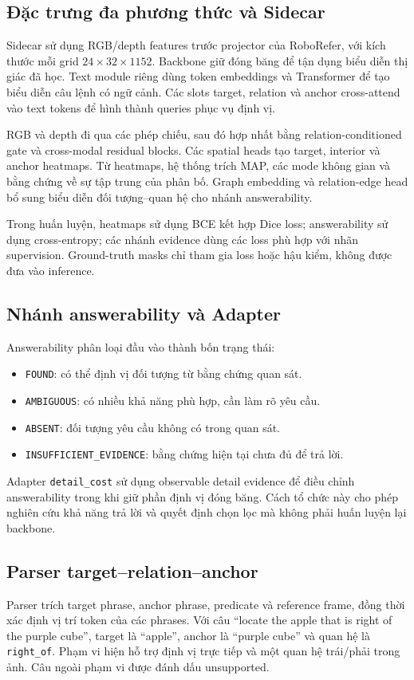 \documentclass[12pt,a4paper]{article}
\begin{document}
\subsection{Đặc trưng đa phương thức và Sidecar}
Sidecar sử dụng RGB/depth features trước projector của RoboRefer, với kích thước mỗi grid $24\times32\times1152$. Backbone giữ đóng băng để tận dụng biểu diễn thị giác đã học. Text module riêng dùng token embeddings và Transformer để tạo biểu diễn câu lệnh có ngữ cảnh. Các slots target, relation và anchor cross-attend vào text tokens để hình thành queries phục vụ định vị.

RGB và depth đi qua các phép chiếu, sau đó hợp nhất bằng relation-conditioned gate và cross-modal residual blocks. Các spatial heads tạo target, interior và anchor heatmaps. Từ heatmaps, hệ thống trích MAP, các mode không gian và bằng chứng về sự tập trung của phân bố. Graph embedding và relation-edge head bổ sung biểu diễn đối tượng--quan hệ cho nhánh answerability.

Trong huấn luyện, heatmaps sử dụng BCE kết hợp Dice loss; answerability sử dụng cross-entropy; các nhánh evidence dùng các loss phù hợp với nhãn supervision. Ground-truth masks chỉ tham gia loss hoặc hậu kiểm, không được đưa vào inference.

\subsection{Nhánh answerability và Adapter}
Answerability phân loại đầu vào thành bốn trạng thái:
\begin{itemize}
\item \texttt{FOUND}: có thể định vị đối tượng từ bằng chứng quan sát.
\item \texttt{AMBIGUOUS}: có nhiều khả năng phù hợp, cần làm rõ yêu cầu.
\item \texttt{ABSENT}: đối tượng yêu cầu không có trong quan sát.
\item \texttt{INSUFFICIENT\_EVIDENCE}: bằng chứng hiện tại chưa đủ để trả lời.
\end{itemize}
Adapter \texttt{detail\_cost} sử dụng observable detail evidence để điều chỉnh answerability trong khi giữ phần định vị đóng băng. Cách tổ chức này cho phép nghiên cứu khả năng trả lời và quyết định chọn lọc mà không phải huấn luyện lại backbone.

\subsection{Parser target--relation--anchor}
Parser trích target phrase, anchor phrase, predicate và reference frame, đồng thời xác định vị trí token của các phrases. Với câu ``locate the apple that is right of the purple cube'', target là ``apple'', anchor là ``purple cube'' và quan hệ là \texttt{right\_of}. Phạm vi hiện hỗ trợ định vị trực tiếp và một quan hệ trái/phải trong ảnh. Câu ngoài phạm vi được đánh dấu unsupported.
\end{document}
